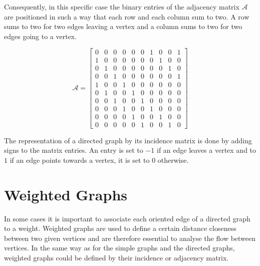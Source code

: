 Consequently, in this specific case the binary entries of the adjacency matrix $\mathcal{A}$ are positioned in such a way that each row and each column sum to two. A row sums to two for two edges leaving a vertex and a column sums to two for two edges going to a vertex.

\begin{equation} \label{eqnB.4}
\mathcal{A}=
\begin{bmatrix}
0 & 0 & 0 & 0 & 0 & 0 & 1 & 0 & 0 & 1 \\
1 & 0 & 0 & 0 & 0 & 0 & 0 & 1 & 0 & 0 \\
0 & 1 & 0 & 0 & 0 & 0 & 0 & 0 & 1 & 0 \\
0 & 0 & 1 & 0 & 0 & 0 & 0 & 0 & 0 & 1 \\
1 & 0 & 0 & 1 & 0 & 0 & 0 & 0 & 0 & 0 \\
0 & 1 & 0 & 0 & 1 & 0 & 0 & 0 & 0 & 0 \\
0 & 0 & 1 & 0 & 0 & 1 & 0 & 0 & 0 & 0 \\
0 & 0 & 0 & 1 & 0 & 0 & 1 & 0 & 0 & 0 \\
0 & 0 & 0 & 0 & 1 & 0 & 0 & 1 & 0 & 0 \\
0 & 0 & 0 & 0 & 0 & 1 & 0 & 0 & 1 & 0
\end{bmatrix}
\end{equation}

The representation of a directed graph by its incidence matrix is done by adding signs to the matrix entries. An entry is set to $-1$ if an edge leaves a vertex and to $1$ if an edge points towards a vertex, it is set to $0$ otherwise.

\section{Weighted Graphs}

In some cases it is important to associate each oriented edge of a directed graph to a weight. Weighted graphs are used to define a certain distance closeness between two given vertices and are therefore essential to analyse the flow between vertices. In the same way as for the simple graphs and the directed graphs, weighted graphs could be defined by their incidence or adjacency matrix.

